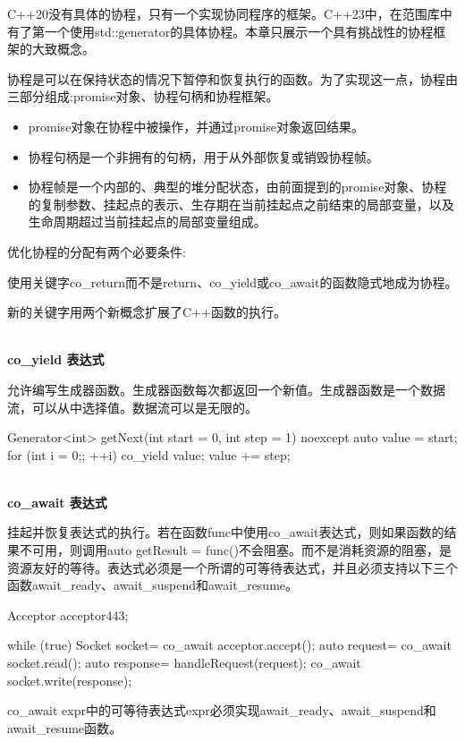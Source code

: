 
C++20没有具体的协程，只有一个实现协同程序的框架。C++23中，在范围库中有了第一个使用std::generator的具体协程。本章只展示一个具有挑战性的协程框架的大致概念。

协程是可以在保持状态的情况下暂停和恢复执行的函数。为了实现这一点，协程由三部分组成:promise对象、协程句柄和协程框架。

\begin{itemize}
\item 
promise对象在协程中被操作，并通过promise对象返回结果。

\item 
协程句柄是一个非拥有的句柄，用于从外部恢复或销毁协程帧。

\item 
协程帧是一个内部的、典型的堆分配状态，由前面提到的promise对象、协程的复制参数、挂起点的表示、生存期在当前挂起点之前结束的局部变量，以及生命周期超过当前挂起点的局部变量组成。
\end{itemize}

优化协程的分配有两个必要条件:

使用关键字co\_return而不是return、co\_yield或co\_await的函数隐式地成为协程。

新的关键字用两个新概念扩展了C++函数的执行。

\noindent
\\\textbf{co\_yield 表达式}

允许编写生成器函数。生成器函数每次都返回一个新值。生成器函数是一个数据流，可以从中选择值。数据流可以是无限的。


\begin{cpp}
Generator<int> getNext(int start = 0, int step = 1) noexcept {
	auto value = start;
	for (int i = 0;; ++i){
		co_yield value;
		value += step;
	}
}
\end{cpp}

\noindent
\\\textbf{co\_await 表达式}

挂起并恢复表达式的执行。若在函数func中使用co\_await表达式，则如果函数的结果不可用，则调用auto getResult = func()不会阻塞。而不是消耗资源的阻塞，是资源友好的等待。表达式必须是一个所谓的可等待表达式，并且必须支持以下三个函数await\_ready、await\_suspend和await\_resume。


\begin{cpp}
Acceptor acceptor{443};

while (true){
	Socket socket= co_await acceptor.accept();
	auto request= co_await socket.read();
	auto response= handleRequest(request);
	co_await socket.write(response);
}
\end{cpp}

co\_await expr中的可等待表达式expr必须实现await\_ready、await\_suspend和await\_resume函数。






















